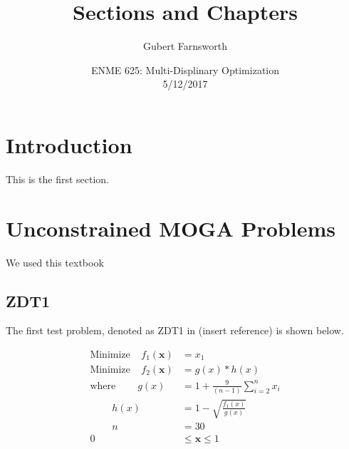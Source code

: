 \documentclass{article}
\title{Sections and Chapters}
\author{Gubert Farnsworth}
\date{ ENME 625: Multi-Displinary Optimization \\ 5/12/2017}
\begin{document}
 
\maketitle

\newpage
 
\tableofcontents
 
\newpage 
 
\section{Introduction}
 
This is the first section.
 

\section{Unconstrained MOGA Problems}
We used this textbook \cite{deb2001multi}

\subsection{ZDT1} 
The first test problem, denoted as ZDT1 in (insert reference) is shown below. 


\begin{align*}
\textrm{Minimize} ~~~~~ f_1(\textbf{x}) &= x_1 \\
\textrm{Minimize} ~~~~~ f_2(\textbf{x}) &= g(x)*h(x) \\
\textrm{where} ~~~~~~~~~~ g(x) &= 1+\frac{9}{(n-1)}\sum_{i=2}^{n}x_i \\
~~~~~~~~~~ h(x) &= 1- \sqrt{\frac{f_1(x)}{g(x)}} \\
~~~~~~~~~~ n &= 30 \\
0 &\leq  \textbf{x}  \leq 1 \\
\end{align*}
\end{document}
